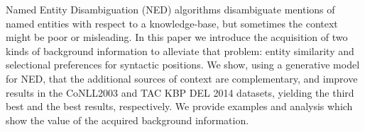 Named Entity Disambiguation (NED) algorithms disambiguate mentions of named entities with respect to a knowledge-base, but sometimes the context might be poor or misleading. In this paper we introduce the acquisition of two kinds of background information to alleviate that problem: entity similarity and selectional preferences for syntactic positions. We show, using a generative model for NED, that the additional sources of context are complementary, and improve results in the CoNLL2003 and TAC KBP DEL 2014 datasets, yielding the third best and the best results, respectively. We provide examples and analysis which show the value of the acquired background information.

